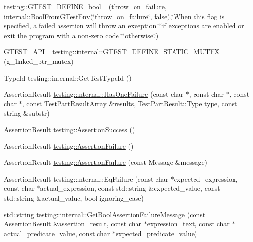 \begin{DoxyCompactItemize}
\item 
\hyperlink{namespacetesting_a05ff4385edff6d44f6823f5eade7abe2}{testing\-::\-G\-T\-E\-S\-T\-\_\-\-D\-E\-F\-I\-N\-E\-\_\-bool\-\_\-} (throw\-\_\-on\-\_\-failure, internal\-::\-Bool\-From\-G\-Test\-Env(\char`\"{}throw\-\_\-on\-\_\-failure\char`\"{}, false),\char`\"{}When this flag is specified, a failed assertion will throw an exception \char`\"{}\char`\"{}if exceptions are enabled or exit the program with a non-\/zero code \char`\"{}\char`\"{}otherwise.\char`\"{})
\item 
\hyperlink{gtest-port_8h_aa73be6f0ba4a7456180a94904ce17790}{G\-T\-E\-S\-T\-\_\-\-A\-P\-I\-\_\-} \hyperlink{namespacetesting_1_1internal_aff419d76acc3727be48d195f927189c9}{testing\-::internal\-::\-G\-T\-E\-S\-T\-\_\-\-D\-E\-F\-I\-N\-E\-\_\-\-S\-T\-A\-T\-I\-C\-\_\-\-M\-U\-T\-E\-X\-\_\-} (g\-\_\-linked\-\_\-ptr\-\_\-mutex)
\item 
Type\-Id \hyperlink{namespacetesting_1_1internal_ad0d66d56ead224263cd100c1d6bfc562}{testing\-::internal\-::\-Get\-Test\-Type\-Id} ()
\item 
Assertion\-Result \hyperlink{namespacetesting_1_1internal_a14ff02e6d151f45e998657674e9af88a}{testing\-::internal\-::\-Has\-One\-Failure} (const char $\ast$, const char $\ast$, const char $\ast$, const Test\-Part\-Result\-Array \&results, Test\-Part\-Result\-::\-Type type, const string \&substr)
\item 
Assertion\-Result \hyperlink{namespacetesting_ac1d0baedb17286c5c6c87bd1a45da8ac}{testing\-::\-Assertion\-Success} ()
\item 
Assertion\-Result \hyperlink{namespacetesting_a75cb789614cb1c28c34627a4a3c053df}{testing\-::\-Assertion\-Failure} ()
\item 
Assertion\-Result \hyperlink{namespacetesting_a56f59110a218942d2fc4695914b1685c}{testing\-::\-Assertion\-Failure} (const Message \&message)
\item 
Assertion\-Result \hyperlink{namespacetesting_1_1internal_a08725846ff184d3e79bcf5be4df19157}{testing\-::internal\-::\-Eq\-Failure} (const char $\ast$expected\-\_\-expression, const char $\ast$actual\-\_\-expression, const std\-::string \&expected\-\_\-value, const std\-::string \&actual\-\_\-value, bool ignoring\-\_\-case)
\item 
std\-::string \hyperlink{namespacetesting_1_1internal_a5fd6e5dc9eb20ab3c3a80e24d89dfac6}{testing\-::internal\-::\-Get\-Bool\-Assertion\-Failure\-Message} (const Assertion\-Result \&assertion\-\_\-result, const char $\ast$expression\-\_\-text, const char $\ast$actual\-\_\-predicate\-\_\-value, const char $\ast$expected\-\_\-predicate\-\_\-value)

\end{DoxyCompactItemize}
